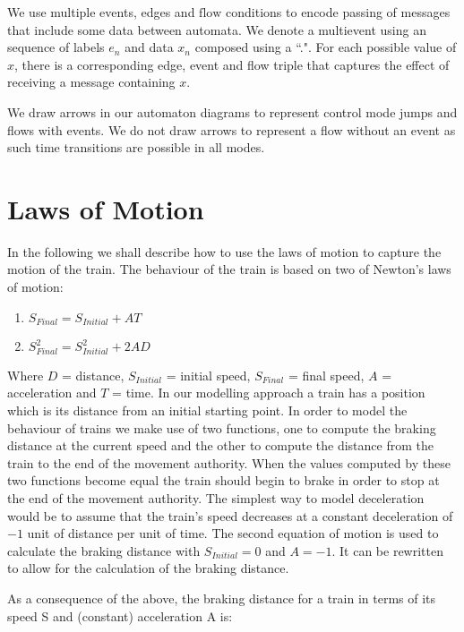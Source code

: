 \begin{myremark}
We use multiple events, edges and $\mathrm{flow}$ conditions to encode passing of messages that include some data between automata.  We denote a multievent using an sequence of labels $e_n$ and data $x_n$ composed using a ``.".  For each possible value of $x$, there is a corresponding edge, event and flow triple that captures the effect of receiving a message containing $x$.
\end{myremark}

\begin{myremark}
We draw arrows in our automaton diagrams to represent control mode jumps and flows with events. We do not draw arrows to represent a flow without an event as such time transitions are possible in all modes.
\end{myremark}
\section{Laws of Motion}\label{sec:lawsofmotion}
In the following we shall describe how to use the laws of motion to capture the motion of the train.
The behaviour of the train is based on two of Newton's laws of motion:
\begin{enumerate}
\item $S_{Final} = S_{Initial} +AT$
\item$S_{Final}^2 = S_{Initial}^2 +2AD$
\end{enumerate}
 Where $D$ = distance, $S_{Initial}$ = initial speed, $S_{Final}$ = final speed, $A$ = acceleration and $T$ = time. In our modelling approach a train has a position which is its distance from an initial starting point. In order to model the behaviour of trains we make use of two functions, one to compute the braking distance at the current speed and the other to compute the distance from the train to the end of the movement authority. When the values computed by these two functions become equal the train should begin to brake in order to stop at the end of the movement authority. The simplest way to model deceleration would be to assume that the train's speed decreases at a constant deceleration of  $-1$ unit of distance per unit of time. The second equation of motion  is used to calculate the braking distance with $S_{Initial} = 0$ and $A = -1$. It can be rewritten to allow for the calculation of the braking distance.
\medskip

As a consequence of the above, the braking distance for a train in terms of its speed S and (constant) acceleration A is: 

